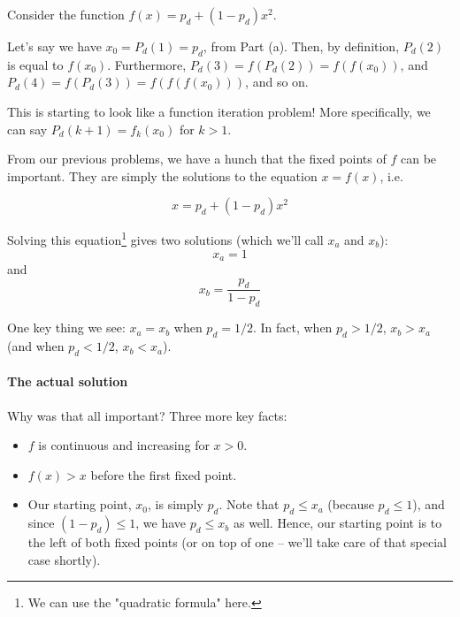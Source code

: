 Consider the function $f(x) = p_d + (1 - p_d)x^2$. 

Let's say we have $x_0 = P_d(1) = p_d$, from Part (a). Then, by definition, $P_d(2)$ is equal to $f(x_0)$. Furthermore, $P_d(3) = f(P_d(2)) = f(f(x_0))$, and $P_d(4) = f(P_d(3)) = f(f(f(x_0)))$, and so on.

This is starting to look like a function iteration problem! More specifically, we can say $P_d(k+1) = f_k(x_0)$ for $k > 1$. 

From our previous problems, we have a hunch that the fixed points of $f$ can be important. They are simply the solutions to the equation $x = f(x)$, i.e.

\begin{equation*}
x = p_d + (1 - p_d)x^2
\end{equation*}

Solving this equation\footnote{We can use the "quadratic formula" here.} gives two solutions (which we'll call $x_a$ and $x_b$):
\begin{equation*}
x_a = 1
\end{equation*}
and 
\begin{equation*}
x_b = \frac{p_d}{1 - p_d}
\end{equation*}

One key thing we see: $x_a = x_b$ when $p_d = 1/2$. In fact, when $p_d > 1/2$, $x_b > x_a$ (and when $p_d < 1/2$, $x_b < x_a$). 




\paragraph{The actual solution}

Why was that all important? Three more key facts:

\begin{itemize}
\item $f$ is continuous and increasing for $x > 0$. 
\item $f(x) > x$ before the first fixed point. 
\item Our starting point, $x_0$, is simply $p_d$. Note that $p_d \leq x_a$ (because $p_d \leq 1$), and since $(1 - p_d) \leq 1$, we have $p_d \leq x_b$ as well. Hence, our starting point is to the left of both fixed points (or on top of one -- we'll take care of that special case shortly). 
\end{itemize}

